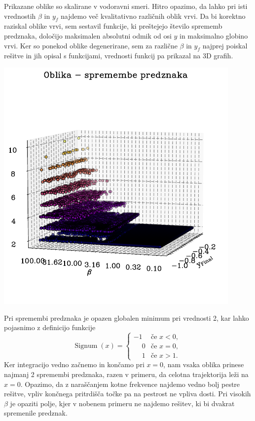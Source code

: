 Prikazane oblike so skalirane v vodoravni smeri. Hitro opazimo, da lahko pri isti vrednostih $\beta$ in $y_f$ najdemo več kvalitativno različnih oblik vrvi. Da bi korektno raziskal oblike vrvi, sem sestavil funkcije, ki preštejejo število sprememb predznaka, določijo maksimalen absolutni odmik od osi $y$ in maksimalno globino vrvi. Ker so ponekod oblike degenerirane, sem za različne $\beta$ in $y_f$ najprej poiskal rešitve in jih opisal s funkcijami, vrednosti funkcij pa prikazal na 3D grafih.
\begin{center}
     \includegraphics[width=0.9\textwidth]{../images/2024-1-fazni_portret_spremembe_opredznaka.pdf}
\end{center}
Pri spremembi predznaka je opazen globalen minimum pri vrednosti 2, kar lahko pojasnimo z definicijo funkcije
\[ \mathrm{Signum}\; (x) = \begin{cases}
-1 &\mbox{če } x < 0, \\
\phantom{-}0  & \mbox{če } x = 0, \\
\phantom{-}1  & \mbox{če } x > 1.
\end{cases}\]
Ker integracijo vedno začnemo in končamo  pri $x = 0$, nam vsaka oblika prinese najmanj 2 spremembi predznaka, razen v primeru, da celotna trajektorija leži na $x=0$. Opazimo, da z naraščanjem kotne frekvence najdemo vedno bolj pestre rešitve, vpliv končnega pritrdišča točke pa na pestrost ne vpliva dosti. Pri visokih $\beta$ je opaziti polje, kjer v nobenem primeru ne najdemo rešitev, ki bi dvakrat spremenile predznak.


